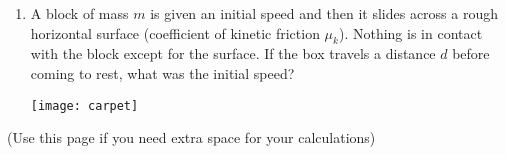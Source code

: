 \documentclass[11pt]{article}
\begin{document}
\begin{enumerate}
\item A block of mass $m$ is given an initial speed and then it slides across a rough horizontal surface (coefficient of kinetic friction $\mu_k$). Nothing is in contact with the block except for the surface. If the box travels a distance $d$ before coming to rest, what was the initial speed?\\
\begin{minipage}[t]{.5\lw}
\end{minipage}\hfill
\begin{minipage}[t]{.45\lw}
\vspace{0in}
\flushright
\texttt{[image: carpet]}
\end{minipage}


\end{enumerate}

\newpage
\thispagestyle{empty}
{\footnotesize (Use this page if you need extra space for your calculations)}
\end{document}
